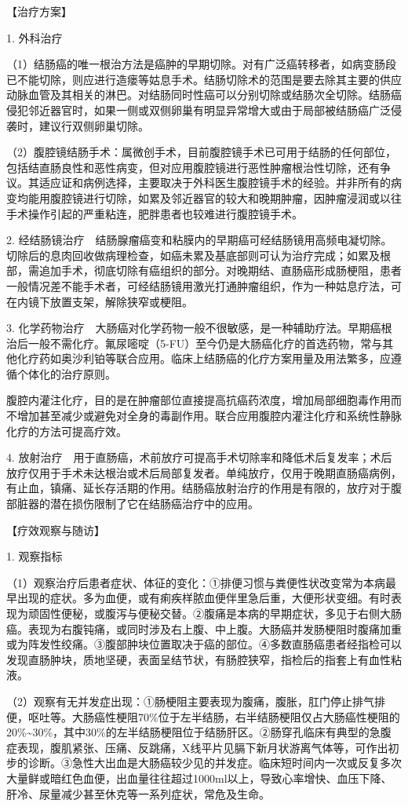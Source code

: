 【治疗方案】

1. 外科治疗

（1）结肠癌的唯一根治方法是癌肿的早期切除。对有广泛癌转移者，如病变肠段已不能切除，则应进行造瘘等姑息手术。结肠切除术的范围是要去除其主要的供应动脉血管及其相关的淋巴。对结肠同时性癌可以分别切除或结肠次全切除。结肠癌侵犯邻近器官时，如果一侧或双侧卵巢有明显异常增大或由于局部被结肠癌广泛侵袭时，建议行双侧卵巢切除。

（2）腹腔镜结肠手术：属微创手术，目前腹腔镜手术已可用于结肠的任何部位，包括结直肠良性和恶性病变，但对应用腹腔镜进行恶性肿瘤根治性切除，还有争议。其适应证和病例选择，主要取决于外科医生腹腔镜手术的经验。并非所有的病变均能用腹腔镜进行切除，如累及邻近器官的较大和晚期肿瘤，因肿瘤浸润或以往手术操作引起的严重粘连，肥胖患者也较难进行腹腔镜手术。

2.
经结肠镜治疗　结肠腺瘤癌变和粘膜内的早期癌可经结肠镜用高频电凝切除。切除后的息肉回收做病理检查，如癌未累及基底部则可认为治疗完成；如累及根部，需追加手术，彻底切除有癌组织的部分。对晚期结、直肠癌形成肠梗阻，患者一般情况差不能手术者，可经结肠镜用激光打通肿瘤组织，作为一种姑息疗法，可在内镜下放置支架，解除狭窄或梗阻。

3.
化学药物治疗　大肠癌对化学药物一般不很敏感，是一种辅助疗法。早期癌根治后一般不需化疗。氟尿嘧啶（5-FU）至今仍是大肠癌化疗的首选药物，常与其他化疗药如奥沙利铂等联合应用。临床上结肠癌的化疗方案用量及用法繁多，应遵循个体化的治疗原则。

腹腔内灌注化疗，目的是在肿瘤部位直接提高抗癌药浓度，增加局部细胞毒作用而不增加甚至减少或避免对全身的毒副作用。联合应用腹腔内灌注化疗和系统性静脉化疗的方法可提高疗效。

4.
放射治疗　用于直肠癌，术前放疗可提高手术切除率和降低术后复发率；术后放疗仅用于手术未达根治或术后局部复发者。单纯放疗，仅用于晚期直肠癌病例，有止血，镇痛、延长存活期的作用。结肠癌放射治疗的作用是有限的，放疗对于腹部脏器的潜在损伤限制了它在结肠癌治疗中的应用。

【疗效观察与随访】

1. 观察指标

（1）观察治疗后患者症状、体征的变化：①排便习惯与粪便性状改变常为本病最早出现的症状。多为血便，或有痢疾样脓血便伴里急后重，大便形状变细。有时表现为顽固性便秘，或腹泻与便秘交替。②腹痛是本病的早期症状，多见于右侧大肠癌。表现为右腹钝痛，或同时涉及右上腹、中上腹。大肠癌并发肠梗阻时腹痛加重或为阵发性绞痛。③腹部肿块位置取决于癌的部位。④多数直肠癌患者经指检可以发现直肠肿块，质地坚硬，表面呈结节状，有肠腔狭窄，指检后的指套上有血性粘液。

（2）观察有无并发症出现：①肠梗阻主要表现为腹痛，腹胀，肛门停止排气排便，呕吐等。大肠癌性梗阻70\%位于左半结肠，右半结肠梗阻仅占大肠癌性梗阻的20\%\textasciitilde{}30\%，其中30\%的左半结肠梗阻位于结肠肝区。②肠穿孔临床有典型的急腹症表现，腹肌紧张、压痛、反跳痛，X线平片见膈下新月状游离气体等，可作出初步的诊断。③急性大出血是大肠癌较少见的并发症。临床短时间内一次或反复多次大量鲜或暗红色血便，出血量往往超过1000ml以上，导致心率增快、血压下降、肝冷、尿量减少甚至休克等一系列症状，常危及生命。

